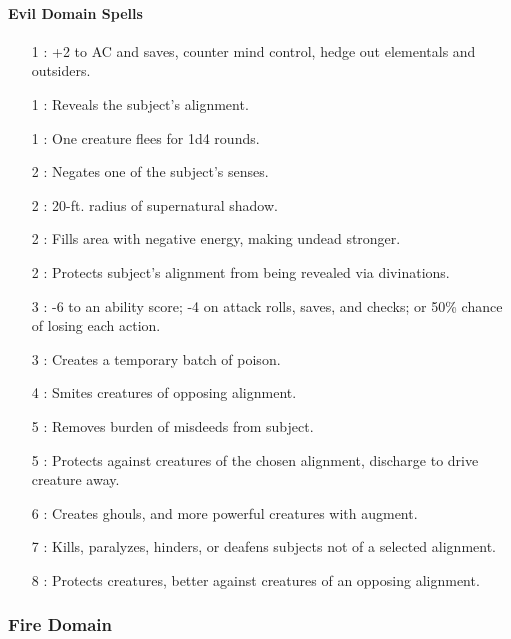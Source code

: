 \paragraph{Evil Domain Spells}
\begin{itemize}
\item[1] : +2 to AC and saves, counter mind control, hedge out elementals and outsiders.
\item[1] : Reveals the subject's alignment.
\item[1] : One creature flees for 1d4 rounds.
\item[2] : Negates one of the subject's senses.
\item[2] : 20-ft. radius of supernatural shadow.
\item[2] : Fills area with negative energy, making undead stronger.
\item[2] : Protects subject's alignment from being revealed via divinations.
\item[3] : -6 to an ability score; -4 on attack rolls, saves, and checks; or 50\% chance of losing each action.
\item[3] : Creates a temporary batch of poison.
\item[4] : Smites creatures of opposing alignment.
\item[5] : Removes burden of misdeeds from subject.
\item[5] : Protects against creatures of the chosen alignment, discharge to drive creature away.
\item[6] : Creates ghouls, and more powerful creatures with augment.
\item[7] : Kills, paralyzes, hinders, or deafens subjects not of a selected alignment.
\item[8] : Protects creatures, better against creatures of an opposing alignment.
\end{itemize}
\subsubsection{Fire Domain}
